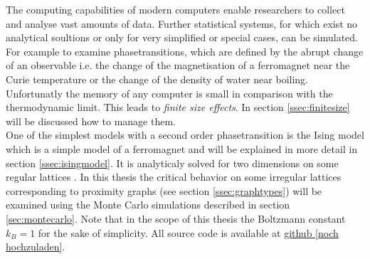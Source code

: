 The computing capabilities of modern computers enable researchers to
collect and analyse vast amounts of data.
Further statistical systems, for which exist no analytical soultions
or only for very simplified or special cases, can be simulated.
For example to examine phasetransitions, which are defined by the abrupt
change of an observable i.e. the change of the magnetisation of a
ferromagnet near the Curie temperature or the change of the density of
water near boiling. Unfortunatly the memory of any computer is small in
comparison with the thermodynamic limit.
This leads to \emph{finite size effects}. In section \ref{ssec:finitesize}
will be discussed how to manage them.\\

One of the simplest models with a second order phasetransition is the
Ising model \cite{Ising1925} which is a simple model of a ferromagnet
and will be explained in more detail in section \ref{ssec:isingmodel}.
It is analyticaly solved for two dimensions on some regular lattices
\cite{Onsager1944} \cite{Wannier1945}.
In this thesis the critical behavior on some irregular lattices
corresponding to proximity graphs (see section \ref{ssec:graphtypes})
will be examined using the Monte Carlo simulations described in section
\ref{sec:montecarlo}. Note that in the scope of this thesis
the Boltzmann constant \(k_{B}=1\) for the sake of simplicity.
All source code is available at \url{github [noch hochzuladen]}.

